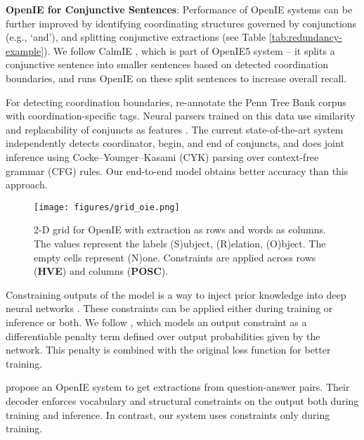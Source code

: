 \documentclass[11pt,a4paper]{article}
\begin{document}
\vspace{0.5ex}
\noindent \textbf{OpenIE for Conjunctive Sentences}: Performance of OpenIE systems can be further improved by identifying coordinating structures governed by conjunctions (e.g., `and'),  and splitting conjunctive extractions (see Table \ref{tab:redundancy-example}). We follow CalmIE \cite{saha&mausam18}, which is part of OpenIE5 system -- it splits a conjunctive sentence into smaller sentences based on detected coordination boundaries, and runs OpenIE on these split sentences to increase overall recall. 





For detecting coordination boundaries, \citet{ficler&goldberg16a} re-annotate the Penn Tree Bank corpus with coordination-specific tags. Neural parsers trained on this data use similarity and replacability of conjuncts as features \cite{ficler&goldberg16b, teranishi+17}. The current state-of-the-art system \citep{teranishi+19} independently detects coordinator, begin, and end of conjuncts, and does joint inference using Cocke–Younger–Kasami (CYK) parsing over context-free grammar (CFG) rules. Our end-to-end model obtains better accuracy than this approach.






\begin{figure}[htp]
\centering
\texttt{[image: figures/grid\_oie.png]}
\hfill
\vspace*{-2ex}
\caption{2-D grid for OpenIE with extraction as rows and words as columns. The values represent the labels (S)ubject, (R)elation, (O)bject. The empty cells represent (N)one. Constraints are applied across rows (\textbf{HVE}) and columns (\textbf{POSC}).}
\label{fig:oie_grid}
\end{figure}

\vspace{0.5ex}
Constraining outputs of the model is a way to inject prior knowledge into deep neural networks \cite{zhiting&al16, xu&al18, nandwani&al19}. These constraints can be applied either during training or inference or both. We follow \citet{mehta&al18}, which models an output constraint as a differentiable penalty term defined over output probabilities given by the network. This penalty is combined with the original loss function for better training.

\citet{bhutani&al19} propose an OpenIE system to get extractions from question-answer pairs.
Their decoder enforces vocabulary and structural constraints on the output both during training and inference.
In contrast, our system uses constraints only during training.
\end{document}

